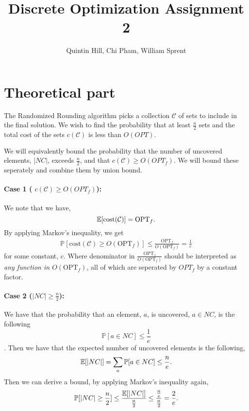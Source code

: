 \documentclass[11pt,a4paper,english]{article}
\newcommand{\PP}{\mathbb{P}}      %
\newcommand{\EE}{\mathbb{E}}      %
\begin{document}
\title{Discrete Optimization Assignment 2}
\author{Quintin Hill, Chi Pham, William Sprent}
\maketitle
\tableofcontents
\clearpage

\section{Theoretical part}
The Randomized Rounding algorithm picks a collection $\mathcal{C}$ of sets to include in
the final solution. We wish to find the probability that at least $\frac{n}{2}$ sets and
the total cost of the sets $c(\mathcal{C})$ is less than $O(OPT)$.

We will equivalently bound the probability that the number of uncovered elements, $|NC|$,
exceeds $\frac{n}{2}$, and that $c(\mathcal{C}) \geq O(OPT_f)$. We will bound these seperately
and combine them by union bound.

\paragraph{Case 1 ( $c(\mathcal{C}) \geq O(OPT_f)$):}
We note that we have,
$$\EE[\mathrm{cost}(\mathcal{C})] = \mathrm{OPT}_f\mathnormal{.}$$
By applying Markov's inequality, we get
\begin{align*}
\PP[\mathrm{cost}(\mathcal{C}) \geq O(\mathrm{OPT}_f)]
  \leq \frac{\mathrm{OPT}_f}{O(\mathrm{OPT}_f)}
  = \frac{1}{c}
\end{align*}
for some constant, $c$. Where denominator in $\frac{\mathrm{OPT}_f}{O(\mathrm{OPT}_f)}$ should be interpreted as
 \textit{any function in $O(\mathrm{OPT}_f)$}, all of which are seperated by $OPT_f$ by a constant factor.

\paragraph{Case 2 ($|NC| \geq \frac{n}{2}$):}
We have that the probability that an element, $a$, is uncovered, $a \in NC$, is the following
$$\PP[a \in NC] \leq \frac{1}{e}$$
\citep[p. 121]{Vaz}.
Then we have that the expected number of uncovered elements is the following,
$$\EE[|NC|] = \sum_a \PP[a \in NC] \leq \frac{n}{e}\mathnormal{.}$$
Then we can derive a bound, by applying Markov's inequality again,
\begin{align*}
  \PP[|NC| \geq \frac{n}{2}] \leq \frac{\EE[|NC|]}{\frac{n}{2}} 
                             \leq \frac{\frac{n}{e}}{\frac{n}{2}} 
                             = \frac{2}{e}\mathnormal{.}
\end{align*}
\end{document}
